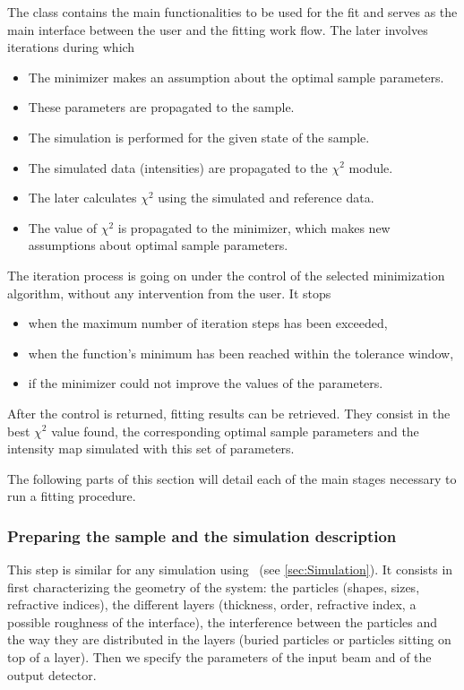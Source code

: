 The class  contains the main functionalities to be used for the fit
and serves as the main interface between the user and the fitting work flow.
The later involves iterations during which

\begin{itemize}
\item The minimizer makes an assumption about the optimal sample parameters.
\item These parameters are propagated to the sample.
\item The simulation is performed for the given state of the sample.
\item The simulated data (intensities) are propagated to the $\chi^2$ module.
\item The later calculates $\chi^2$ using the simulated and reference data.
\item The value of $\chi^2$ is propagated to the minimizer, which makes new assumptions about optimal sample parameters.
\end{itemize}

The iteration process is going on under the control of the selected minimization
algorithm, without any intervention from the
user. It stops
\begin{itemize}
\item when the maximum number of iteration steps has been exceeded,
\item when the function's minimum has been reached within the tolerance window,
\item if the minimizer could not improve the values of the parameters.
\end{itemize}

After the control is returned, fitting results can be retrieved.
They consist in the best $\chi^2$ value found, the corresponding
optimal sample parameters and the intensity map simulated with this set of parameters.

The following parts of this section will detail each of
the main stages necessary to run a fitting procedure.


\subsubsection{Preparing the sample and the simulation description}

This step is similar for any simulation using \BornAgain\ (see \cref{sec:Simulation}). It consists in first characterizing  the geometry of the system: the particles
(shapes, sizes, refractive
indices), the different layers (thickness,
order, refractive index, a possible roughness of the interface), the
interference between the particles and the way they are distributed in
the layers (buried particles or particles sitting on top of a
layer).
Then we specify the parameters of the input beam and of the
output detector.


